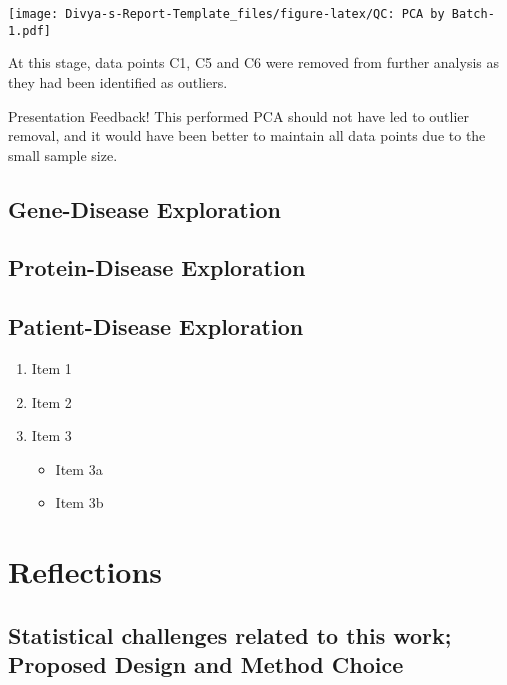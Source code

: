 \documentclass[
]{article}
\providecommand{\tightlist}{%
  \setlength{\itemsep}{0pt}\setlength{\parskip}{0pt}}
\begin{document}
\texttt{[image: Divya-s-Report-Template\_files/figure-latex/QC: PCA by Batch-1.pdf]}

At this stage, data points C1, C5 and C6 were removed from further
analysis as they had been identified as outliers.

Presentation Feedback! This performed PCA should not have led to outlier
removal, and it would have been better to maintain all data points due
to the small sample size.

\hypertarget{gene-disease-exploration}{%
\subsection{Gene-Disease Exploration}\label{gene-disease-exploration}}

\hypertarget{protein-disease-exploration}{%
\subsection{Protein-Disease
Exploration}\label{protein-disease-exploration}}

\hypertarget{patient-disease-exploration}{%
\subsection{Patient-Disease
Exploration}\label{patient-disease-exploration}}

\begin{enumerate}
\def\labelenumi{\arabic{enumi}.}
\tightlist
\item
  Item 1
\item
  Item 2
\item
  Item 3

  \begin{itemize}
  \tightlist
  \item
    Item 3a
  \item
    Item 3b
  \end{itemize}
\end{enumerate}

\hypertarget{reflections}{%
\section{Reflections}\label{reflections}}

\hypertarget{statistical-challenges-related-to-this-work-proposed-design-and-method-choice}{%
\subsection{Statistical challenges related to this work; Proposed Design
and Method
Choice}\label{statistical-challenges-related-to-this-work-proposed-design-and-method-choice}}
\end{document}
